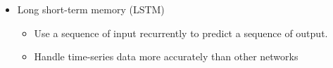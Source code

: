 {\begin{itemize}
\begin{itemize}
            \item A decoder using deconvolution operation to transform the latent space representation back to the original size field
        \end{itemize}
    \item Long short-term memory (LSTM)
        \begin{itemize}
            \item Use a sequence of input recurrently to predict a sequence of output.
            
            \item Handle time-series data more accurately than other networks
        \end{itemize}
        
\end{itemize}
}




